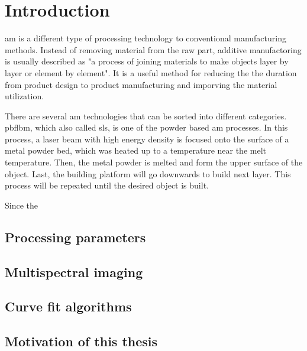 \glsresetall%
\chapter{Introduction}%

\gls{am} is a different type of processing technology to conventional 
manufacturing methods. Instead of removing material from the raw part, 
additive manufactoring is usually described as "a process of joining materials
to make objects layer by layer or element by element"\cite{Frazier.2014}.
It is a useful method for reducing the the duration from product design 
to product manufacturing and imporving the material 
utilization\cite{Swift.2013b}. 


There are several \gls{am} technologies that can be sorted into different 
categories. \gls{pbflbm}, which also called \gls{sls}, is one of the powder 
based \gls{am} processes\cite{Kruth.1991}. In this process, a laser beam 
with high energy density is focused onto the surface of a metal powder bed, 
which was heated up to a temperature near the melt temperature. Then, the 
metal powder is melted and form the upper surface of the object. Last, the 
building platform will go downwards to build next layer. This process will be 
repeated until the desired object is built\cite{RevillaLeon.2019}.


Since the 
%
\section{Processing parameters}

\section{Multispectral imaging}

\section{Curve fit algorithms}

\section{Motivation of this thesis}